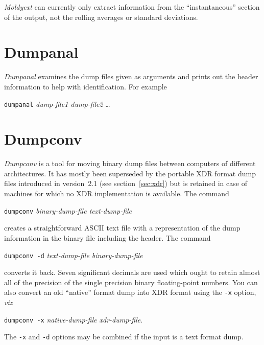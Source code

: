 \documentclass[twoside]{report}
\begin{document}
{\em Moldyext\/} can currently only extract information from the
``instantaneous'' section of the output, not the rolling averages or
standard deviations.

\section{Dumpanal}%
{\em Dumpanal\/} examines the dump files given as arguments and
prints out the header information to help with identification. For
example
\begin{center}
\texttt{dumpanal} {\em dump-file1 dump-file2} \ldots
\end{center}

\section{Dumpconv}%
\label{sec:dumpconv}
{\em Dumpconv\/} is a tool for moving binary dump files between
computers of different architectures.  It has mostly been superseded
by the portable XDR format dump files introduced in version~2.1 (see
section~\ref{sec:xdr}) but is retained in case of machines for which
no XDR implementation is available.  The command
\begin{center}
\texttt{dumpconv} {\em binary-dump-file text-dump-file} 
\end{center}
creates a straightforward ASCII text file with a representation of the
dump information in the binary file including the header.  The command
\begin{center}
\texttt{dumpconv -d} {\em text-dump-file binary-dump-file} 
\end{center}
converts it back.  Seven significant decimals are used which ought to
retain almost all of the precision of the single precision binary
floating-point numbers.  You can also convert an old ``native'' format
dump into XDR format using the \texttt{-x} option, {\em viz\/}
\begin{center}
\texttt{dumpconv -x} {\em native-dump-file xdr-dump-file}. 
\end{center}
The \texttt{-x} and \texttt{-d} options may be combined if the input is a
text format dump.
\end{document}
